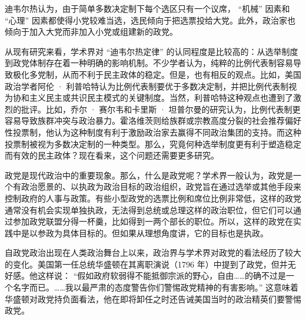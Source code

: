 
迪韦尔热认为，由于简单多数决定制下每个选区只有一个议席， “机械” 因素和 “心理” 因素都使得小党较难当选，选民倾向于把选票投给大党。此外，政治家也倾向于加入大党而非加入小党或组建新的政党。

从现有研究来看，学术界对 “迪韦尔热定律” 的认同程度是比较高的：从选举制度到政党体制存在着一种明确的影响机制。不少学者认为，纯粹的比例代表制容易导致极化多党制，从而不利于民主政体的稳定。但是，也有相反的观点。比如，美国政治学者阿伦 · 利普哈特认为比例代表制要优于多数决定制，并把比例代表制视为协和主义民主或共识民主模式的关键制度。当然，利普哈特这种观点也遭到了激烈的批评。比如，乔尔 · 赛尔韦和卡里斯 · 坦普尔曼的研究认为，比例代表制更容易导致族群冲突与政治暴力。霍洛维茨则给族群或宗教高度分裂的社会推荐偏好性投票制，他认为这种制度有利于激励政治家去赢得不同政治集团的支持。而这种投票制被视为多数决定制的一种类型。那么，究竟何种选举制度更有利于塑造稳定而有效的民主政体？现在看来，这个问题还需要更多研究。


政党是现代政治中的重要现象。那么，什么是政党呢？学术界一般认为，政党是一个有政治愿景的、以执政为政治目标的政治组织，政党旨在通过选举或其他手段来控制政府的人事与政策。有些小型政党的选票比例和席位比例非常低，这样的政党通常没有机会实现单独执政，无法得到总统或总理这样的政治职位，但它们可以通过参加政党联盟分得一杯羹，比如得到一两个部长的职位。所以，这样的政党在实践中是以参政为具体目标的。但如果从理想角度讲，它的目标也是执政。

自政党政治出现在人类政治舞台上以来，政治界与学术界对政党的看法经历了较大的变化。美国第一任总统华盛顿在其离职演说（1796 年）中提到了政党，但并无好感。他这样说： “假如政府软弱得不能抵御宗派的野心，自由……的确不过是一个名字而已。……我以最严肃的态度警告你们警惕政党精神的有害影响。” 这意味着华盛顿对政党持负面看法，他在即将卸任之时还告诫美国当时的政治精英们要警惕政党。


